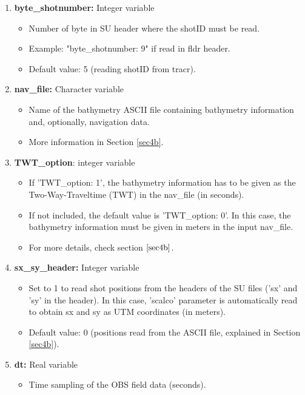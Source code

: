 \documentclass[11pt, oneside]{article}   	%
\begin{document}
\begin{enumerate}
\item \textbf{byte\_shotnumber:} Integer variable
\begin{itemize}
\item  Number of byte in SU header where the shotID must be read. 
\item Example: "byte\_shotnumber: 9" if read in fldr header.
\item Default value: 5 (reading shotID from tracr).
\end{itemize}

\item \textbf{nav\_file:} Character variable
\begin{itemize}
\item Name of the bathymetry ASCII file containing bathymetry information and, optionally, navigation data.
\item More information in Section \ref{sec4b}.
\end{itemize}

\item \textbf{TWT\_option}: integer variable 
	\begin{itemize}
	\item If 'TWT\_option: 1', the bathymetry information has to be given as the Two-Way-Traveltime (TWT) in the nav\_file (in seconds).
	\item If not included, the default value is 'TWT\_option: 0'. In this case, the bathymetry information must be given in meters in the input nav\_file.
	\item For more details, check section $\ref{sec4b}$.
	\end{itemize}
  
 \item \textbf{sx\_sy\_header:} Integer variable
\begin{itemize}
\item Set to 1 to read shot positions from the headers of the SU files ('sx' and 'sy' in the header). In this case, 'scalco' parameter is automatically read to obtain sx and sy as UTM coordinates (in meters).
\item Default value: 0 (positions read from the ASCII file, explained in Section \ref{sec4b}).
\end{itemize}

\item \textbf{dt:} Real variable
\begin{itemize}
\item Time sampling of the OBS field data (seconds).
\end{itemize}


\end{enumerate}
\end{document}
